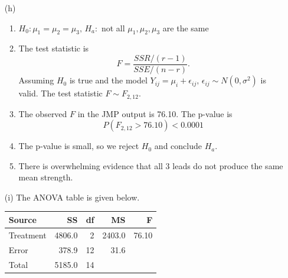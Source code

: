 \documentclass{article}\usepackage[]{graphicx}\usepackage[]{color}
\begin{document}
\begin{enumerate}
\begin{itemize}
  \item[(h)]
  \begin{enumerate}[label = \arabic*.]
  \item $H_0: \mu_1 = \mu_2 = \mu_3,\, H_a: $ not all $\mu_1, \mu_2, \mu_3$ are the same
  \item
  The test statistic is 
  \[F = \frac{SSR/(r - 1)}{SSE/(n - r)}.\]
  Assuming $H_0$ is true and the model $Y_{ij} = \mu_i + \epsilon_{ij},\, \epsilon_{ij} \sim N(0, \sigma^2)$ is valid. The test statistic $F \sim F_{2, 12}$. 
  \item The observed $F$ in the JMP output is 76.10. The p-value is
  \[P(F_{2,12} > 76.10) < 0.0001\]
  \item
  The p-value is small, so we reject $H_0$ and conclude $H_a$.
  \item
  There is overwhelming evidence that all 3 leads do not produce the same mean strength.
  \end{enumerate}
  \item[(i)]
  The ANOVA table is given below.
  \begin{center}
  \begin{tabular}{lrrrr}
  \hline
  Source & SS & df & MS & F\\ \hline
  Treatment & 4806.0 & 2 & 2403.0 & 76.10\\
  Error & 378.9 & 12 & 31.6 & \\ \hline
  Total & 5185.0 & 14 &&\\ \hline
  \end{tabular}
  \end{center}
	\end{itemize}
	
\end{enumerate}
% 
%
\end{document}
